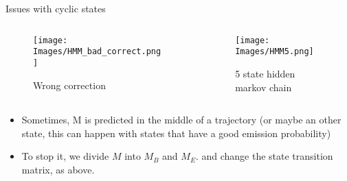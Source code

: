 \documentclass{beamer}
\begin{document}
\begin{frame}{Issues with cyclic states}

\begin{columns}[T] %
\begin{column}{.58\textwidth}
\begin{figure}[!ht]
\centering
\texttt{[image: Images/HMM\_bad\_correct.png]}
\caption{Wrong correction}
\label{bad_correction}
\end{figure}
\end{column}%
\hfill%
\begin{column}{.38\textwidth}
\begin{figure}[!ht]
\centering
\texttt{[image: Images/HMM5.png]}
\caption{5 state hidden markov chain}
\label{trajectory_5}
\end{figure}
\end{column}%
\end{columns}
\begin{footnotesize}
\begin{itemize}
\item Sometimes, M is predicted in the middle of a trajectory (or maybe an other state, this can happen with states that have a good emission probability)
\item To stop it, we divide $M$ into $M_B$ and $M_E$. and change the state transition matrix, as above.
\end{itemize}
\end{footnotesize}
\end{frame}
\end{document}
